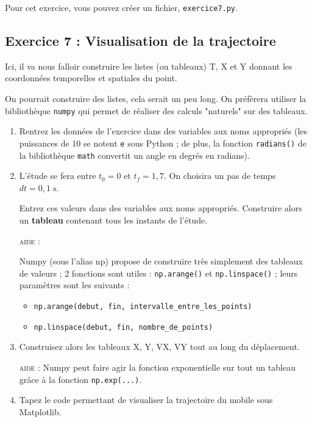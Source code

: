 \documentclass[11pt]{article}
\begin{document}
\medskip




Pour cet exercice, vous pouvez créer un fichier, \texttt{exercice7.py}.

\medskip


\subsection{Exercice 7 : Visualisation de la trajectoire}


Ici, il va nous falloir construire les listes (ou tableaux) T, X et Y donnant les coordonnées temporelles et spatiales du point.

\medskip
On pourrait construire des listes, cela serait un peu long. On préfèrera utiliser la bibliothèque \texttt{numpy} qui permet de réaliser des calculs "naturels" sur des tableaux.

\medskip



 
\begin{enumerate}
 \item Rentrez les données de l'exercice dans des variables aux noms appropriés (les puissances de 10 se notent \texttt{e} sous Python ; de plus, la fonction \texttt{radians()} de la bibliothèque \texttt{math} convertit un angle en degrés en radians).
 
 \item L'étude se fera entre $t_0 = 0$ et $t_f = 1,7$. On choisira un pas de temps $dt = 0,1\;\text{s}$.
 


 
 
 Entrez ces valeurs dans des variables aux noms appropriés. Construire alors un \textbf{tableau} contenant tous les instants de l'étude.
 
 \textsc{aide : }
 
 Numpy (sous l'alias np) propose de construire très simplement des tableaux de valeurs ; 2 fonctions sont utiles : \texttt{np.arange()} et \texttt{np.linspace()} ; leurs paramètres sont les suivants : 
 
 \begin{itemize}
  \item \texttt{np.arange(debut, fin, intervalle\_entre\_les\_points)}
  \item \texttt{np.linspace(debut, fin, nombre\_de\_points)}
 \end{itemize}
 
 
 
 \item Construisez alors les tableaux X, Y, VX, VY tout au long du déplacement.
 
  \textsc{aide : } Numpy peut faire agir la fonction exponentielle sur tout un tableau grâce à la fonction \texttt{np.exp(...)}.
 
 
 \item Tapez le code permettant de visualiser la trajectoire du mobile sous Matplotlib.

 
 

 \end{enumerate}
 
\end{document}
